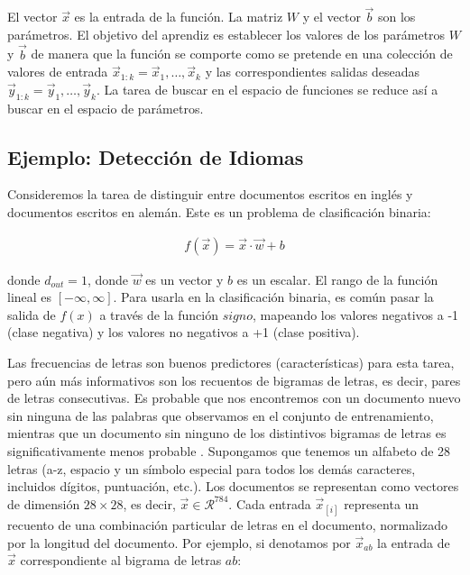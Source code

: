 El vector $\vec{x}$ es la entrada de la función. La matriz $W$ y el vector $\vec{b}$ son los parámetros. El objetivo del aprendiz es establecer los valores de los parámetros $W$ y $\vec{b}$ de manera que la función se comporte como se pretende en una colección de valores de entrada $\vec{x}_{1:k} = \vec{x}_1,\dots,\vec{x}_k$ y las correspondientes salidas deseadas $\vec{y}_{1:k} = \vec{y}_1,\dots,\vec{y}_k$. La tarea de buscar en el espacio de funciones se reduce así a buscar en el espacio de parámetros.

\subsection{Ejemplo: Detección de Idiomas}

Consideremos la tarea de distinguir entre documentos escritos en inglés y documentos escritos en alemán. Este es un problema de clasificación binaria:

\begin{equation}
\begin{split}
f(\vec{x}) = \vec{x} \cdot \vec{w} + b
\end{split}
\end{equation}

donde $d_{out} = 1$, donde $\vec{w}$ es un vector y $b$ es un escalar. El rango de la función lineal es $[-\infty, \infty]$. Para usarla en la clasificación binaria, es común pasar la salida de $f(x)$ a través de la función $signo$, mapeando los valores negativos a -1 (clase negativa) y los valores no negativos a +1 (clase positiva).

Las frecuencias de letras son buenos predictores (características) para esta tarea, pero aún más informativos son los recuentos de bigramas de letras, es decir, pares de letras consecutivas. Es probable que nos encontremos con un documento nuevo sin ninguna de las palabras que observamos en el conjunto de entrenamiento, mientras que un documento sin ninguno de los distintivos bigramas de letras es significativamente menos probable \cite{goldberg2017neural}. Supongamos que tenemos un alfabeto de 28 letras (a-z, espacio y un símbolo especial para todos los demás caracteres, incluidos dígitos, puntuación, etc.). Los documentos se representan como vectores de dimensión $28 \times 28$, es decir, $\vec{x} \in \mathcal{R}^{784}$. Cada entrada $\vec{x}_{[i]}$ representa un recuento de una combinación particular de letras en el documento, normalizado por la longitud del documento. Por ejemplo, si denotamos por $\vec{x}_{ab}$ la entrada de $\vec{x}$ correspondiente al bigrama de letras $ab$:

